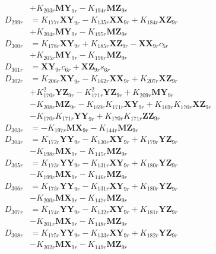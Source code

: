 \begin{multicols}{2}
\begin{align}
&+ K_{203r}\mathbf{MY}_{9r} - K_{194r}\mathbf{MZ}_{9r} \nonumber \\
D_{299r} &= K_{177r}\mathbf{XY}_{9r} - K_{135r}\mathbf{XX}_{9r} + K_{184r}\mathbf{XZ}_{9r}  \nonumber \\
&+ K_{204r}\mathbf{MY}_{9r} - K_{195r}\mathbf{MZ}_{9r} \nonumber \\
D_{300r} &= K_{178r}\mathbf{XY}_{9r} + K_{185r}\mathbf{XZ}_{9r} - \mathbf{XX}_{9r}c_{5r}  \nonumber \\
&+ K_{205r}\mathbf{MY}_{9r} - K_{196r}\mathbf{MZ}_{9r} \nonumber \\
D_{301r} &= \mathbf{XY}_{9r}c_{6r} + \mathbf{XZ}_{9r}s_{6r} \nonumber \\
D_{302r} &= K_{206r}\mathbf{XY}_{9r} - K_{162r}\mathbf{XX}_{9r} + K_{207r}\mathbf{XZ}_{9r}  \nonumber \\
&+ K_{170r}^2\mathbf{YZ}_{9r} - K_{171r}^2\mathbf{YZ}_{9r} + K_{209r}\mathbf{MY}_{9r}  \nonumber \\
&- K_{208r}\mathbf{MZ}_{9r} - K_{169r}K_{171r}\mathbf{XY}_{9r} + K_{169r}K_{170r}\mathbf{XZ}_{9r}  \nonumber \\
&- K_{170r}K_{171r}\mathbf{YY}_{9r} + K_{170r}K_{171r}\mathbf{ZZ}_{9r} \nonumber \\
D_{303r} &= - K_{197r}\mathbf{MX}_{9r} - K_{144r}\mathbf{MZ}_{9r} \nonumber \\
D_{304r} &= K_{172r}\mathbf{YY}_{9r} - K_{130r}\mathbf{XY}_{9r} + K_{179r}\mathbf{YZ}_{9r}  \nonumber \\
&- K_{198r}\mathbf{MX}_{9r} - K_{145r}\mathbf{MZ}_{9r} \nonumber \\
D_{305r} &= K_{173r}\mathbf{YY}_{9r} - K_{131r}\mathbf{XY}_{9r} + K_{180r}\mathbf{YZ}_{9r}  \nonumber \\
&- K_{199r}\mathbf{MX}_{9r} - K_{146r}\mathbf{MZ}_{9r} \nonumber \\
D_{306r} &= K_{173r}\mathbf{YY}_{9r} - K_{131r}\mathbf{XY}_{9r} + K_{180r}\mathbf{YZ}_{9r}  \nonumber \\
&- K_{200r}\mathbf{MX}_{9r} - K_{147r}\mathbf{MZ}_{9r} \nonumber \\
D_{307r} &= K_{174r}\mathbf{YY}_{9r} - K_{132r}\mathbf{XY}_{9r} + K_{181r}\mathbf{YZ}_{9r}  \nonumber \\
&- K_{201r}\mathbf{MX}_{9r} - K_{148r}\mathbf{MZ}_{9r} \nonumber \\
D_{308r} &= K_{175r}\mathbf{YY}_{9r} - K_{133r}\mathbf{XY}_{9r} + K_{182r}\mathbf{YZ}_{9r}  \nonumber \\
&- K_{202r}\mathbf{MX}_{9r} - K_{149r}\mathbf{MZ}_{9r} \nonumber \\

\end{align}
\end{multicols}
